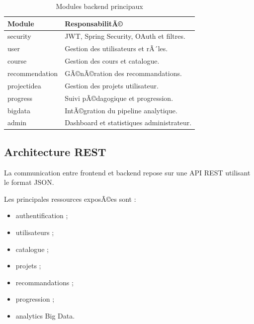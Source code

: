 ﻿\documentclass[12pt,a4paper]{report}
\begin{document}
\begin{table}[H]
    \centering
    \caption{Modules backend principaux}

    \begin{tabular}{|p{4cm}|p{9cm}|}
        \hline
        \textbf{Module} & \textbf{ResponsabilitÃ©} \\
        \hline

        security &
        JWT, Spring Security, OAuth et filtres. \\
        
        \hline

        user &
        Gestion des utilisateurs et rÃ´les. \\
        
        \hline

        course &
        Gestion des cours et catalogue. \\
        
        \hline

        recommendation &
        GÃ©nÃ©ration des recommandations. \\
        
        \hline

        projectidea &
        Gestion des projets utilisateur. \\
        
        \hline

        progress &
        Suivi pÃ©dagogique et progression. \\
        
        \hline

        bigdata &
        IntÃ©gration du pipeline analytique. \\
        
        \hline

        admin &
        Dashboard et statistiques administrateur. \\
        
        \hline
    \end{tabular}
\end{table}

\subsection{Architecture REST}

La communication entre frontend et backend repose sur une API REST utilisant le format JSON.

Les principales ressources exposÃ©es sont :
\begin{itemize}
    \item authentification ;
    \item utilisateurs ;
    \item catalogue ;
    \item projets ;
    \item recommandations ;
    \item progression ;
    \item analytics Big Data.
\end{itemize}
\end{document}
